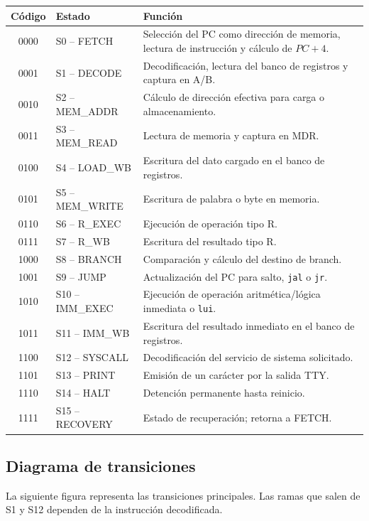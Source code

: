 \documentclass[11pt,a4paper]{article}
\begin{document}
\begin{longtable}{@{}clp{9cm}@{}}
\toprule
\textbf{Código} & \textbf{Estado} & \textbf{Función} \\
\midrule
0000 & S0 -- FETCH & Selección del PC como dirección de memoria, lectura de instrucción y cálculo de $PC+4$. \\
0001 & S1 -- DECODE & Decodificación, lectura del banco de registros y captura en A/B. \\
0010 & S2 -- MEM\_ADDR & Cálculo de dirección efectiva para carga o almacenamiento. \\
0011 & S3 -- MEM\_READ & Lectura de memoria y captura en MDR. \\
0100 & S4 -- LOAD\_WB & Escritura del dato cargado en el banco de registros. \\
0101 & S5 -- MEM\_WRITE & Escritura de palabra o byte en memoria. \\
0110 & S6 -- R\_EXEC & Ejecución de operación tipo R. \\
0111 & S7 -- R\_WB & Escritura del resultado tipo R. \\
1000 & S8 -- BRANCH & Comparación y cálculo del destino de branch. \\
1001 & S9 -- JUMP & Actualización del PC para salto, \texttt{jal} o \texttt{jr}. \\
1010 & S10 -- IMM\_EXEC & Ejecución de operación aritmética/lógica inmediata o \texttt{lui}. \\
1011 & S11 -- IMM\_WB & Escritura del resultado inmediato en el banco de registros. \\
1100 & S12 -- SYSCALL & Decodificación del servicio de sistema solicitado. \\
1101 & S13 -- PRINT & Emisión de un carácter por la salida TTY. \\
1110 & S14 -- HALT & Detención permanente hasta reinicio. \\
1111 & S15 -- RECOVERY & Estado de recuperación; retorna a FETCH. \\
\bottomrule
\end{longtable}

\subsection{Diagrama de transiciones}

La siguiente figura representa las transiciones principales. Las ramas que salen de S1 y S12 dependen de la instrucción decodificada.
\end{document}

